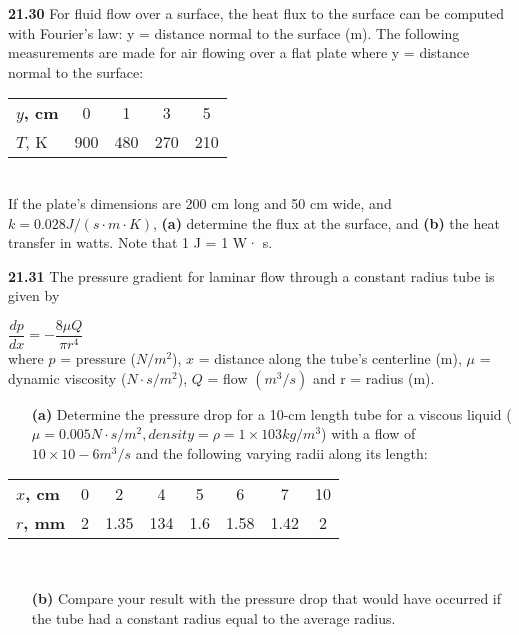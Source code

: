 \documentclass[../main.tex]{subfiles}
\begin{document}
\begin{multicols}{2}
\begin{tabular}{cccc}
	
	\hline
\end{tabular}

\vspace{0,15 cm}

\textbf{21.30} For fluid flow over a surface, the heat flux to the surface can be computed with Fourier's law: y = distance normal to the surface (m). The following measurements are made for air flowing over a flat plate where y = distance normal to the surface:\\
\begin{tabular}{lcccc}
	\hline

	\textbf{$y$, cm} & 0 & 1 & 3 & 5\\
	
	\textbf{$T$}, K & 900 & 480 & 270 & 210\\
	
	\hline
\end{tabular}\\
If the plate's dimensions are 200 cm long and 50 cm wide,
and $k = 0.028 J/(s · m · K)$, \textbf{(a)} determine the flux at the surface, and \textbf{(b)} the heat transfer in watts. Note that 1 J = 1 W· s.

\textbf{21.31} The pressure gradient for laminar flow through a constant radius tube is given by

$\dfrac{dp}{dx} = - \dfrac{8\mu Q}{\pi r^4}$\\
where $p$ = pressure ($N/m^2$), $x$ = distance along the tube's
centerline (m), $μ$ = dynamic viscosity ($N · s/m^2$), $Q$ = flow
$(m^3/s)$ and r = radius (m).
\begin{enumerate}
	\item[\textbf{(a)}] Determine the pressure drop for a 10-cm length tube
for a viscous liquid ($μ = 0.005 N · s/m^2, density = ρ = 1 × 103 kg/m^3$) with a flow of $10 × 10−6 m^3/s$ and the following varying radii along its length: 
\end{enumerate}
\begin{tabular}{lccccccc}
\hline

	\textbf{$x$, cm} & 0 & 2 & 4 & 5 & 6 & 7 & 10\\
	\textbf{$r$, mm} & 2 & 1.35 & 134 & 1.6 & 1.58 & 1.42 & 2\\

\hline
\end{tabular}\\
\begin{enumerate}
	\item[\textbf{(b)}]Compare your result with the pressure drop that would
have occurred if the tube had a constant radius equal to
the average radius.


\end{enumerate}
\end{multicols}
\end{document}

